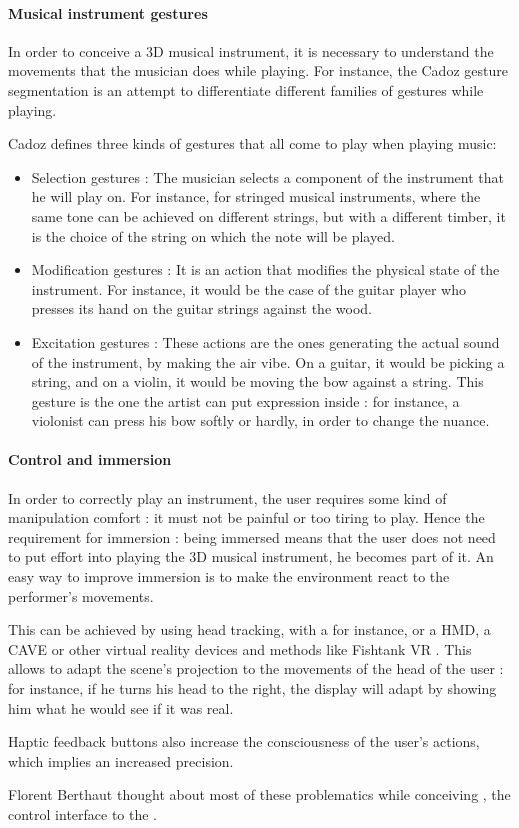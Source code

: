\paragraph{Musical instrument gestures}
In order to conceive a 3D musical instrument, it is necessary to understand the movements that the musician does while playing. For instance, the Cadoz gesture segmentation \cite{cadoz1999musique} is an attempt to differentiate different families of gestures while playing.

Cadoz defines three kinds of gestures that all come to play when playing music:

\begin{itemize}
\item Selection gestures : The musician selects a component of the instrument that he will play on. For instance, for stringed musical instruments, where the same tone can be achieved on different strings, but with a different timber, it is the choice of the string on which the note will be played.
\item Modification gestures : It is an action that modifies the physical state of the instrument. For instance, it would be the case of the guitar player who presses its hand on the guitar strings against the wood. 
\item Excitation gestures : These actions are the ones generating the actual sound of the instrument, by making the air vibe. On a guitar, it would be picking a string, and on a violin, it would be moving the bow against a string. This gesture is the one the artist can put expression inside : for instance, a violonist can press his bow softly or hardly, in order to change the nuance.
\end{itemize}

\paragraph{Control and immersion}
In order to correctly play an instrument, the user requires some kind of manipulation comfort : it must not be painful or too tiring to play. 
Hence the requirement for immersion : being immersed means that the user does not need to put effort into playing the 3D musical instrument, he becomes part of it.
An easy way to improve immersion is to make the environment react to the performer's movements. 

This can be achieved by using head tracking, with a  for instance, or a \ac{HMD}, a \ac{CAVE} or other virtual reality devices and methods like Fishtank VR \cite{robertson1997immersion}. This allows to adapt the scene's projection to the movements of the head of the user : for instance, if he turns his head to the right, the display will adapt by showing him what he would see if it was real.

Haptic feedback buttons also increase the consciousness of the user's actions, which implies an increased precision.

Florent Berthaut thought about most of these problematics while conceiving  \cite{berthaut2010piivert}, the control interface to the .
